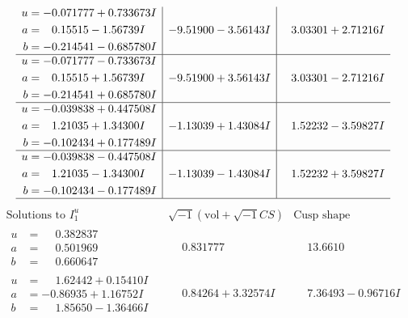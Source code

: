 \documentclass[1p]{elsarticle_modified}
\theoremstyle{definition}
\newcommand{\I}{\sqrt{-1}}
\begin{document}
$$\begin{array}{c|c|c}
\begin{aligned}
u &= -0.071777 + 0.733673 I \\
a &= \phantom{-}0.15515 - 1.56739 I \\
b &= -0.214541 - 0.685780 I\end{aligned}
 & -9.51900 - 3.56143 I & \phantom{-}3.03301 + 2.71216 I \\ \hline\begin{aligned}
u &= -0.071777 - 0.733673 I \\
a &= \phantom{-}0.15515 + 1.56739 I \\
b &= -0.214541 + 0.685780 I\end{aligned}
 & -9.51900 + 3.56143 I & \phantom{-}3.03301 - 2.71216 I \\ \hline\begin{aligned}
u &= -0.039838 + 0.447508 I \\
a &= \phantom{-}1.21035 + 1.34300 I \\
b &= -0.102434 + 0.177489 I\end{aligned}
 & -1.13039 + 1.43084 I & \phantom{-}1.52232 - 3.59827 I \\ \hline\begin{aligned}
u &= -0.039838 - 0.447508 I \\
a &= \phantom{-}1.21035 - 1.34300 I \\
b &= -0.102434 - 0.177489 I\end{aligned}
 & -1.13039 - 1.43084 I & \phantom{-}1.52232 + 3.59827 I\\
 \hline 
 \end{array}$$\newpage$$\begin{array}{c|c|c}  
\text{Solutions to }I^u_{1}& \I (\text{vol} + \sqrt{-1}CS) & \text{Cusp shape}\\
 \hline 
\begin{aligned}
u &= \phantom{-}0.382837\phantom{ +0.000000I} \\
a &= \phantom{-}0.501969\phantom{ +0.000000I} \\
b &= \phantom{-}0.660647\phantom{ +0.000000I}\end{aligned}
 & \phantom{-}0.831777\phantom{ +0.000000I} & \phantom{-}13.6610\phantom{ +0.000000I} \\ \hline\begin{aligned}
u &= \phantom{-}1.62442 + 0.15410 I \\
a &= -0.86935 + 1.16752 I \\
b &= \phantom{-}1.85650 - 1.36466 I\end{aligned}
 & \phantom{-}0.84264 + 3.32574 I & \phantom{-}7.36493 - 0.96716 I \\ \hline\begin{aligned}

\end{aligned}
\end{array}$$
\end{document}
